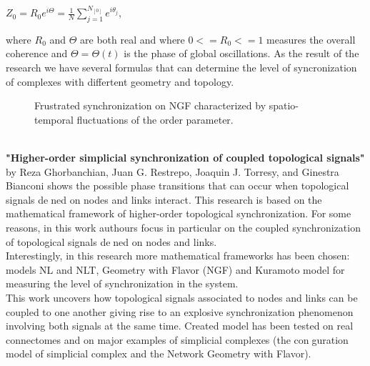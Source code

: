 \documentclass[draft]{article}
\newcommand\tab[1][1cm]{\hspace*{#1}}
\begin{document}
\begin{center}
$Z_0 = R_0e^{i\Theta} = \frac{1}{N} \sum_{j=1}^{N_[0]}e^{i\theta _j}$,
\end{center}
where $R_0$ and $\Theta$ are both real and where $0<=R_0<=1$ measures the overall coherence and $\Theta = \Theta (t)$ is the phase of global oscillations.
\tab As the result of the research we have several formulas that can determine the level of syncronization of complexes with differtent geometry and topology.
\begin{figure}[h]
\caption{Frustrated synchronization on NGF characterized by spatio-temporal fluctuations of the order parameter\cite{litlink3}.}
\label{ris:image}
\end{figure}\\
\tab \textbf{"Higher-order simplicial synchronization of coupled topological signals"\cite{litlink5}} by Reza Ghorbanchian, Juan G. Restrepo, Joaquin J. Torresy, and Ginestra Bianconi shows the possible phase transitions that can occur when topological signals dened on nodes and links interact. This research is based on the mathematical framework of higher-order topological synchronization. For some reasons, in this work authours focus in particular on the coupled synchronization of topological signals dened on nodes and links.\\
\tab Interestingly, in this research more mathematical frameworks has been chosen: models NL and NLT, Geometry with Flavor (NGF) and Kuramoto model for measuring the level of synchronization in the system.\\
\tab This work uncovers how topological signals associated to nodes and links can be coupled to one another giving rise to an explosive synchronization phenomenon involving both signals at the same time. Created model has been tested on real connectomes and on major examples of simplicial complexes (the conguration model of simplicial complex and the Network Geometry with Flavor).\\
\end{document}
